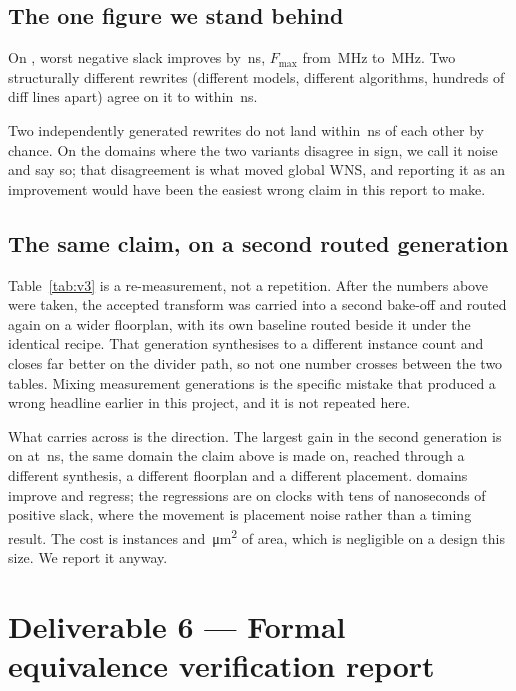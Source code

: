 \documentclass[11pt,a4paper]{article}
\newcommand{\claim}[1]{%
  \par\smallskip\noindent
  \colorbox{accent!6}{%
    \begin{minipage}{\dimexpr\linewidth-2\fboxsep}
      \vspace{3pt}#1\vspace{3pt}
    \end{minipage}}\par\smallskip}
\begin{document}
\subsection{The one figure we stand behind}

\claim{On \bestclock, worst negative slack improves by \bestdelta\,ns,
$F_{\max}$ from \bestfmaxfrom\,MHz to \bestfmaxto\,MHz. Two structurally
different rewrites (different models, different algorithms, hundreds of diff
lines apart) agree on it to within \bestagreement\,ns.}

Two independently generated rewrites do not land within \bestagreement\,ns of
each other by chance. On the domains where the two variants disagree in sign,
we call it noise and say so; that disagreement is what moved global WNS, and
reporting it as an improvement would have been the easiest wrong claim in this
report to make.

\subsection{The same claim, on a second routed generation}



Table~\ref{tab:v3} is a re-measurement, not a repetition. After the numbers
above were taken, the accepted transform was carried into a second bake-off
and routed again on a wider floorplan, with its own baseline routed beside it
under the identical recipe. That generation synthesises to a different
instance count and closes far better on the divider path, so not one number
crosses between the two tables. Mixing measurement generations is the specific
mistake that produced a wrong headline earlier in this project, and it is not
repeated here.

What carries across is the direction. The largest gain in the second
generation is on \vthreeclock{} at \vthreedelta\,ns, the same domain the claim
above is made on, reached through a different synthesis, a different floorplan
and a different placement. \vthreegains{} domains improve and
\vthreeregress{} regress; the regressions are on clocks with tens of
nanoseconds of positive slack, where the movement is placement noise rather
than a timing result. The cost is \vthreeinstances{} instances and
\vthreearea\,\si{\um\squared} of area, which is negligible on a design this
size. We report it anyway.

\section{Deliverable 6 --- Formal equivalence verification report}
\label{sec:d6}
\end{document}
